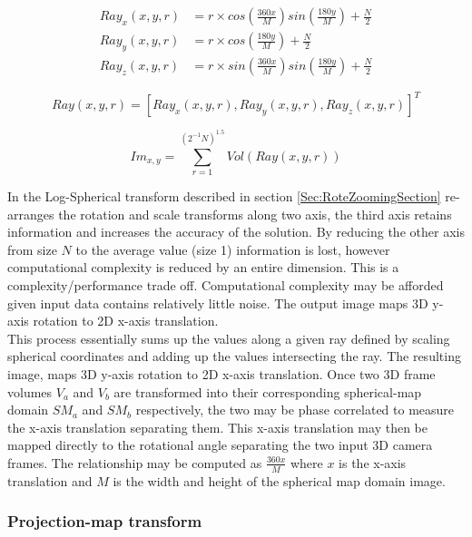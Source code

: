 \begin{equation} \label{eqn:invLPFuncs}
\begin{split}
Ray_x(x,y,r) & = r \times cos\left(\frac{360x}{M}\right)sin\left(\frac{180y}{M}\right)  + \frac{N}{2} \\
Ray_y(x,y,r) & = r \times cos\left(\frac{180y}{M}\right) + \frac{N}{2} \\
Ray_z(x,y,r) & = r \times sin\left(\frac{360x}{M}\right)sin\left(\frac{180y}{M}\right) + \frac{N}{2}
\end{split}
\end{equation}

\begin{equation} \label{eqn:invLPVVF}
Ray(x,y,r) = [Ray_x(x,y,r), Ray_y(x,y,r), Ray_z(x,y,r)]^T
\end{equation}

\begin{equation} \label{eqn:smtUpdate}
Im_{x,y} = \sum_{r=1}^{(2^{-1}N)^{1.5}}{Vol(Ray(x,y,r))} 
\end{equation}

In the Log-Spherical transform described in section \ref{Sec:RoteZoomingSection} re-arranges the rotation and scale transforms along two axis, the third axis retains information and increases the accuracy of the solution. By reducing the other axis from size $N$ to the average value (size 1) information is lost, however computational complexity is reduced by an entire dimension. This is a complexity/performance trade off. Computational complexity may be afforded given input data contains relatively little noise. The output image maps 3D y-axis rotation to 2D x-axis translation. \\


This process essentially sums up the values along a given ray defined by scaling spherical coordinates and adding up the values intersecting the ray. The resulting image, maps 3D y-axis rotation to 2D x-axis translation. Once two 3D frame volumes $V_a$ and $V_b$ are transformed into their corresponding spherical-map domain $SM_a$ and $SM_b$ respectively, the two may be phase correlated to measure the x-axis translation separating them. This x-axis translation may then be mapped directly to the rotational angle separating the two input 3D camera frames. The relationship may be computed as $\frac{360x}{M}$ where $x$ is the x-axis translation and $M$ is the width and height of the spherical map domain image. \\


\subsubsection{Projection-map transform}
\label{sec:PMTramsform}

